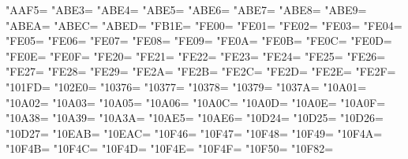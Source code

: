 \XeTeXcharclass"AAF5=\KclassCM
\XeTeXcharclass"ABE3=\KclassCM
\XeTeXcharclass"ABE4=\KclassCM
\XeTeXcharclass"ABE5=\KclassCM
\XeTeXcharclass"ABE6=\KclassCM
\XeTeXcharclass"ABE7=\KclassCM
\XeTeXcharclass"ABE8=\KclassCM
\XeTeXcharclass"ABE9=\KclassCM
\XeTeXcharclass"ABEA=\KclassCM
\XeTeXcharclass"ABEC=\KclassCM
\XeTeXcharclass"ABED=\KclassCM
\XeTeXcharclass"FB1E=\KclassCM
\XeTeXcharclass"FE00=\KclassCM
\XeTeXcharclass"FE01=\KclassCM
\XeTeXcharclass"FE02=\KclassCM
\XeTeXcharclass"FE03=\KclassCM
\XeTeXcharclass"FE04=\KclassCM
\XeTeXcharclass"FE05=\KclassCM
\XeTeXcharclass"FE06=\KclassCM
\XeTeXcharclass"FE07=\KclassCM
\XeTeXcharclass"FE08=\KclassCM
\XeTeXcharclass"FE09=\KclassCM
\XeTeXcharclass"FE0A=\KclassCM
\XeTeXcharclass"FE0B=\KclassCM
\XeTeXcharclass"FE0C=\KclassCM
\XeTeXcharclass"FE0D=\KclassCM
\XeTeXcharclass"FE0E=\KclassCM
\XeTeXcharclass"FE0F=\KclassCM
\XeTeXcharclass"FE20=\KclassCM
\XeTeXcharclass"FE21=\KclassCM
\XeTeXcharclass"FE22=\KclassCM
\XeTeXcharclass"FE23=\KclassCM
\XeTeXcharclass"FE24=\KclassCM
\XeTeXcharclass"FE25=\KclassCM
\XeTeXcharclass"FE26=\KclassCM
\XeTeXcharclass"FE27=\KclassCM
\XeTeXcharclass"FE28=\KclassCM
\XeTeXcharclass"FE29=\KclassCM
\XeTeXcharclass"FE2A=\KclassCM
\XeTeXcharclass"FE2B=\KclassCM
\XeTeXcharclass"FE2C=\KclassCM
\XeTeXcharclass"FE2D=\KclassCM
\XeTeXcharclass"FE2E=\KclassCM
\XeTeXcharclass"FE2F=\KclassCM
\XeTeXcharclass"101FD=\KclassCM
\XeTeXcharclass"102E0=\KclassCM
\XeTeXcharclass"10376=\KclassCM
\XeTeXcharclass"10377=\KclassCM
\XeTeXcharclass"10378=\KclassCM
\XeTeXcharclass"10379=\KclassCM
\XeTeXcharclass"1037A=\KclassCM
\XeTeXcharclass"10A01=\KclassCM
\XeTeXcharclass"10A02=\KclassCM
\XeTeXcharclass"10A03=\KclassCM
\XeTeXcharclass"10A05=\KclassCM
\XeTeXcharclass"10A06=\KclassCM
\XeTeXcharclass"10A0C=\KclassCM
\XeTeXcharclass"10A0D=\KclassCM
\XeTeXcharclass"10A0E=\KclassCM
\XeTeXcharclass"10A0F=\KclassCM
\XeTeXcharclass"10A38=\KclassCM
\XeTeXcharclass"10A39=\KclassCM
\XeTeXcharclass"10A3A=\KclassCM
\XeTeXcharclass"10AE5=\KclassCM
\XeTeXcharclass"10AE6=\KclassCM
\XeTeXcharclass"10D24=\KclassCM
\XeTeXcharclass"10D25=\KclassCM
\XeTeXcharclass"10D26=\KclassCM
\XeTeXcharclass"10D27=\KclassCM
\XeTeXcharclass"10EAB=\KclassCM
\XeTeXcharclass"10EAC=\KclassCM
\XeTeXcharclass"10F46=\KclassCM
\XeTeXcharclass"10F47=\KclassCM
\XeTeXcharclass"10F48=\KclassCM
\XeTeXcharclass"10F49=\KclassCM
\XeTeXcharclass"10F4A=\KclassCM
\XeTeXcharclass"10F4B=\KclassCM
\XeTeXcharclass"10F4C=\KclassCM
\XeTeXcharclass"10F4D=\KclassCM
\XeTeXcharclass"10F4E=\KclassCM
\XeTeXcharclass"10F4F=\KclassCM
\XeTeXcharclass"10F50=\KclassCM
\XeTeXcharclass"10F82=\KclassCM
